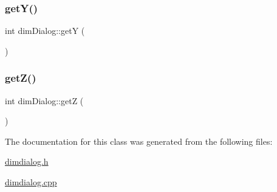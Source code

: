 \mbox{\label{classdim_dialog_abac25538a87509e6486a9427f99cc85b}} 
\subsubsection{\texorpdfstring{get\+Y()}{getY()}}
{\footnotesize\ttfamily int dim\+Dialog\+::getY (\begin{DoxyParamCaption}{ }\end{DoxyParamCaption})}

\mbox{\label{classdim_dialog_ac1133f232d42c4e86b68faaa12af98ee}} 
\subsubsection{\texorpdfstring{get\+Z()}{getZ()}}
{\footnotesize\ttfamily int dim\+Dialog\+::getZ (\begin{DoxyParamCaption}{ }\end{DoxyParamCaption})}



The documentation for this class was generated from the following files\+:\begin{DoxyCompactItemize}
\item 
\hyperlink{dimdialog_8h}{dimdialog.\+h}\item 
\hyperlink{dimdialog_8cpp}{dimdialog.\+cpp}\end{DoxyCompactItemize}
